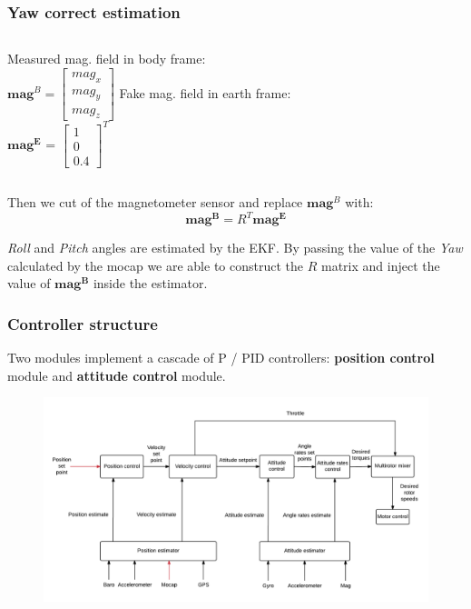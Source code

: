 \documentclass[xcolor=dvipsnames]{beamer}
\begin{document}
\begin{frame}[t]
\frametitle{Yaw correct estimation}

\begin{columns}[t]
Measured mag. field in body frame:
\\
\vspace{1em}
$\boldsymbol{mag}^B = \begin{bmatrix}mag_x \\ mag_y \\ mag_z\end{bmatrix}$ 
Fake mag. field in earth frame:
\\
\vspace{1em}
$\boldsymbol{mag^E}$ = $\begin{bmatrix}1\\ 0 \\ 0.4\end{bmatrix}^T$
\end{columns}
\vspace{1em}
Then we cut of the magnetometer sensor and replace $\boldsymbol{mag}^B$ with:
\begin{equation}
	 \boldsymbol{mag^B} = R^T \boldsymbol{mag^E}
\end{equation}
\vspace{1ex}

\textit{Roll} and \textit{Pitch} angles are estimated by the EKF. By passing the value of the \textit{Yaw} calculated by the mocap we are able to construct the $R$ matrix and inject the value of $\boldsymbol{mag^B}$ inside the estimator.
\end{frame}


\begin{frame}
\frametitle{Controller structure}
Two modules implement a cascade of P / PID controllers: \textbf{position control} module and \textbf{attitude control} module.
\begin{figure}
\centering
\includegraphics[width = 1\textwidth]{f/control_arch.png}
\end{figure}
\end{frame}
\end{document}
